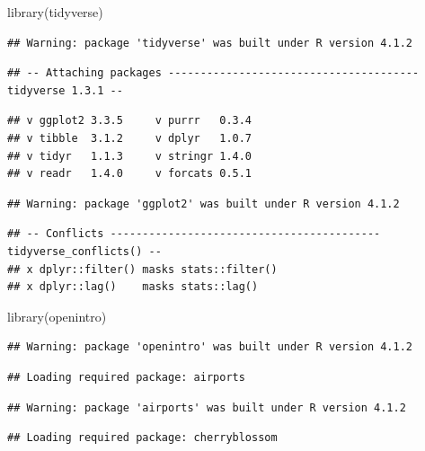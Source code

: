 \documentclass[
]{article}
\newenvironment{Shaded}{\begin{snugshade}}{\end{snugshade}}
\newcommand{\FunctionTok}[1]{\textcolor[rgb]{0.00,0.00,0.00}{#1}}
\newcommand{\NormalTok}[1]{#1}
\begin{document}
\begin{Shaded}
\begin{Highlighting}[]
\FunctionTok{library}\NormalTok{(tidyverse)}
\end{Highlighting}
\end{Shaded}

\begin{verbatim}
## Warning: package 'tidyverse' was built under R version 4.1.2
\end{verbatim}

\begin{verbatim}
## -- Attaching packages --------------------------------------- tidyverse 1.3.1 --
\end{verbatim}

\begin{verbatim}
## v ggplot2 3.3.5     v purrr   0.3.4
## v tibble  3.1.2     v dplyr   1.0.7
## v tidyr   1.1.3     v stringr 1.4.0
## v readr   1.4.0     v forcats 0.5.1
\end{verbatim}

\begin{verbatim}
## Warning: package 'ggplot2' was built under R version 4.1.2
\end{verbatim}

\begin{verbatim}
## -- Conflicts ------------------------------------------ tidyverse_conflicts() --
## x dplyr::filter() masks stats::filter()
## x dplyr::lag()    masks stats::lag()
\end{verbatim}

\begin{Shaded}
\begin{Highlighting}[]
\FunctionTok{library}\NormalTok{(openintro)}
\end{Highlighting}
\end{Shaded}

\begin{verbatim}
## Warning: package 'openintro' was built under R version 4.1.2
\end{verbatim}

\begin{verbatim}
## Loading required package: airports
\end{verbatim}

\begin{verbatim}
## Warning: package 'airports' was built under R version 4.1.2
\end{verbatim}

\begin{verbatim}
## Loading required package: cherryblossom
\end{verbatim}
\end{document}
